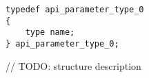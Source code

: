 \begin{lstlisting}[language={[ANSI]C}, sensitive=true, tabsize=4, frame=shadowbox,
	keywords={if, else, for, while, return, goto, typedef, struct, api_parameter_type_0, type},
	keywordstyle=\kwdsty]
typedef api_parameter_type_0
{
    type name;
} api_parameter_type_0;
\end{lstlisting}

\des
// TODO: structure description
\ndes
\ntyp
